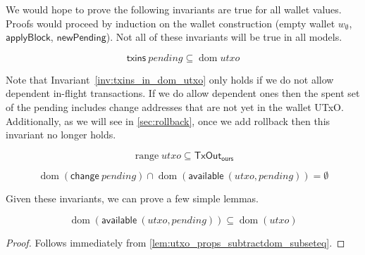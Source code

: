 \documentclass{article}
\DeclareMathOperator{\dom}{dom}
\DeclareMathOperator{\range}{range}
\theoremstyle{definition}{
  \newtheorem{lemma}{Lemma}[section] %
  \newtheorem{definition}[lemma]{Definition}
}
\theoremstyle{theorem}{
  \newtheorem{invariant}[lemma]{Invariant}
  \newtheorem{proofobligation}[lemma]{Proof Obligation}
}
\numberwithin{equation}{lemma}
\begin{document}
We would hope to prove the following invariants are true for all wallet values.
Proofs would proceed by induction on the wallet construction (empty wallet
$w_\emptyset$, $\mathsf{applyBlock}$, $\mathsf{newPending}$). Not
all of these invariants will be true in all models.

\begin{invariant}
\begin{equation*}
\mathsf{txins} ~ \mathit{pending} \subseteq \dom \mathit{utxo}
\end{equation*}
\label{inv:txins_in_dom_utxo}
\end{invariant}

Note that Invariant~\ref{inv:txins_in_dom_utxo} only holds if we do not allow
dependent in-flight transactions. If we do allow dependent ones then the spent
set of the pending includes change addresses that are not yet in the wallet
UTxO. Additionally, as we will see in \cref{sec:rollback}, once we add
rollback then this invariant no longer holds.

\begin{invariant}
%
\begin{equation*}
\range \mathit{utxo} \subseteq \mathsf{TxOut_{ours}}
\end{equation*}
\label{inv:utxo_is_ours}
\end{invariant}

\begin{invariant}
\begin{equation*}
\dom (\mathsf{change} ~ \mathit{pending}) \cap \dom (\mathsf{available} ~ (\mathit{utxo}, \mathit{pending})) = \emptyset
\end{equation*}
\label{inv:change_vs_available}
\end{invariant}

Given these invariants, we can prove a few simple lemmas.

\begin{lemma}
\begin{equation*}
\dom(\mathsf{available} ~ (\mathit{utxo}, \mathit{pending}))
\subseteq \dom(\mathit{utxo})
\end{equation*}
\label{lem:dom_available}
\end{lemma}

\begin{proof}
Follows immediately from
\cref{lem:utxo_props_subtractdom_subseteq}.
\end{proof}
\end{document}
